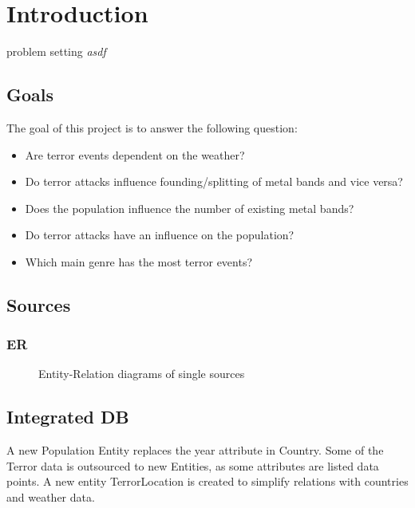 
\section{Introduction}


problem setting
\emph{asdf}




\subsection{Goals}
The goal of this project is to answer the following question:
	\begin{itemize}
		\item Are terror events dependent on the weather?
		\item Do terror attacks influence founding/splitting of metal bands and vice versa?
		\item Does the population influence the number of existing metal bands?
		\item Do terror attacks have an influence on the population?
		\item Which main genre has the most terror events?
	\end{itemize}





\subsection{Sources}


\subsubsection{ER}
\begin{figure}[!hbt]
\centering
    \qquad
    \qquad
    \qquad
\caption{Entity-Relation diagrams of single sources}
\label{fig:example subfigure}
\end{figure}




\subsection{Integrated DB}
A new Population Entity replaces the year attribute in Country. Some of the Terror data is outsourced to new Entities, as some attributes are listed data points. A new entity TerrorLocation is created to simplify relations with countries and weather data.

